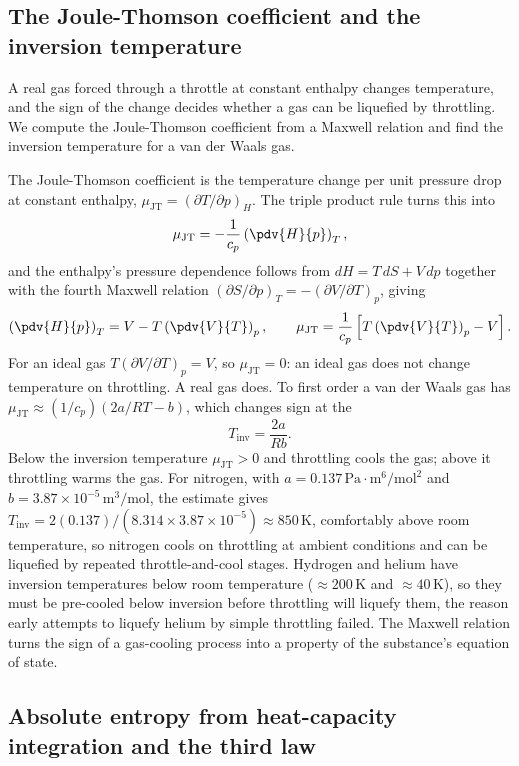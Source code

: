\subsection{The Joule-Thomson coefficient and the inversion temperature}

A real gas forced through a throttle at constant enthalpy changes temperature, and
the sign of the change decides whether a gas can be liquefied by throttling. We
compute the Joule-Thomson coefficient from a Maxwell relation and find the
inversion temperature for a van der Waals gas.

The Joule-Thomson coefficient is the temperature change per unit pressure drop at
constant enthalpy, $\mu_{\text{JT}} = (\partial T/\partial p)_H$. The triple
product rule turns this into
\[
\mu_{\text{JT}} = -\frac{1}{c_p}\left(\pdv{H}{p}\right)_T,
\]
and the enthalpy's pressure dependence follows from $dH = T\,dS + V\,dp$ together
with the fourth Maxwell relation $(\partial S/\partial p)_T = -(\partial
V/\partial T)_p$, giving
\[
\left(\pdv{H}{p}\right)_T = V - T\left(\pdv{V}{T}\right)_p,
\qquad
\mu_{\text{JT}} = \frac{1}{c_p}\left[T\left(\pdv{V}{T}\right)_p - V\right].
\]
For an ideal gas $T(\partial V/\partial T)_p = V$, so $\mu_{\text{JT}} = 0$: an
ideal gas does not change temperature on throttling. A real gas does. To first
order a van der Waals gas has $\mu_{\text{JT}} \approx (1/c_p)(2a/RT - b)$, which
changes sign at the 
\[
T_{\text{inv}} = \frac{2a}{Rb}.
\]
Below the inversion temperature $\mu_{\text{JT}} > 0$ and throttling cools the gas;
above it throttling warms the gas. For nitrogen, with $a = 0.137\,\text{Pa}\cdot
\text{m}^6/\text{mol}^2$ and $b = 3.87\times10^{-5}\,\text{m}^3/\text{mol}$, the
estimate gives $T_{\text{inv}} = 2(0.137)/(8.314 \times 3.87\times10^{-5}) \approx
850\,\si{\kelvin}$, comfortably above room temperature, so nitrogen cools on
throttling at ambient conditions and can be liquefied by repeated
throttle-and-cool stages. Hydrogen and helium have inversion temperatures below
room temperature ($\approx 200\,\si{\kelvin}$ and $\approx 40\,\si{\kelvin}$), so
they must be pre-cooled below inversion before throttling will liquefy them, the
reason early attempts to liquefy helium by simple throttling failed. The Maxwell
relation turns the sign of a gas-cooling process into a property of the
substance's equation of state.

\subsection{Absolute entropy from heat-capacity integration and the third law}

